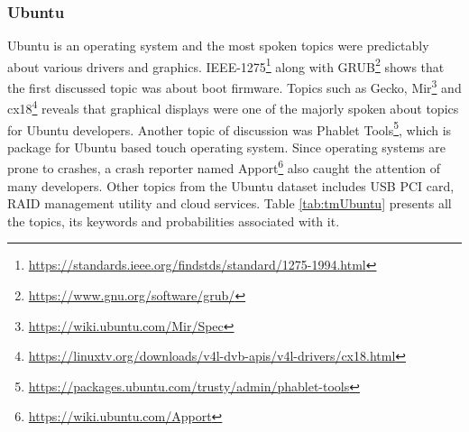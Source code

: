 \documentclass[a4paper,12pt,twoside]{report}
\begin{document}
\subsubsection{Ubuntu}
Ubuntu is an operating system and the most spoken topics were predictably about various drivers and graphics. IEEE-1275\footnote{\url{https://standards.ieee.org/findstds/standard/1275-1994.html}} along with GRUB\footnote{\url{https://www.gnu.org/software/grub/}} shows that the first discussed topic was about boot firmware. Topics such as Gecko, Mir\footnote{\url{https://wiki.ubuntu.com/Mir/Spec}} and cx18\footnote{\url{https://linuxtv.org/downloads/v4l-dvb-apis/v4l-drivers/cx18.html}} reveals that graphical displays were one of the majorly spoken about topics for Ubuntu developers. Another topic of discussion was Phablet Tools\footnote{\url{https://packages.ubuntu.com/trusty/admin/phablet-tools}}, which is package for Ubuntu based touch operating system. Since operating systems are prone to crashes, a crash reporter named Apport\footnote{\url{https://wiki.ubuntu.com/Apport}} also caught the attention of many developers. Other topics from the Ubuntu dataset includes USB PCI card, RAID management utility and cloud services. Table \ref{tab:tmUbuntu} presents all the topics, its keywords and probabilities associated with it. 
\end{document}
